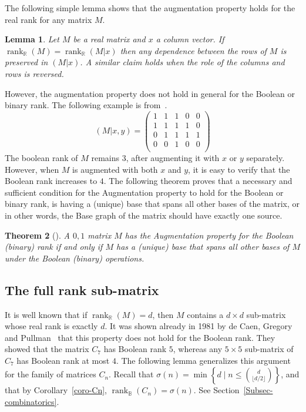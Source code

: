 \documentclass[11pt]{article}
\newtheorem{theorem}{Theorem}
\newtheorem{lemma}[theorem]{Lemma}
\newcommand{\rank}{\mathop{\mathrm{rank}}}
\newcommand{\Rbool}{{\rank}_\mathbb{B}}
\newcommand{\Rreal}{{\rank}_\mathbb{R}}
\begin{document}
The following simple lemma shows that the augmentation property holds for the real rank for any matrix $M$. 

\begin{lemma}
\label{sumofrowaugmented}
Let $M$ be a real matrix and $x$ a column vector.
If $\Rreal(M) = \Rreal(M|x)$ then any dependence between the rows of $M$ is preserved in $(M|x)$.
A similar claim holds when the role of the columns and rows is reversed.
\end{lemma}

However, the augmentation property does not hold in general for the Boolean or binary  rank. The following example is from~\cite{parnas2018augmentation}.
$$
(M|x,y)=
\left(
     \begin{array}{ccc|cc}
 1 & 1 & 1 &0&0\\
 1 & 1 & 1 &1&0\\
 0 & 1 & 1 &1&1\\
 0 & 0& 1  &0&0\\
\end{array}
\right)
$$
The boolean rank of $M$ remains $3$, after augmenting it with $x$ or $y$ separately.
However, when $M$ is augmented with both $x$ and $y$, it is easy to verify that the Boolean rank increases to $4$.
The following theorem proves that a necessary and sufficient condition for the Augmentation property to hold
for the Boolean or binary rank, is having a (unique) base that spans all other bases of the matrix,
or in other words, the Base graph of the matrix should have exactly one source.

\begin{theorem}[\cite{parnas2018augmentation}]
A $0,1$ matrix $M$ has the Augmentation property for the Boolean (binary)
rank if and only if  $M$ has a (unique) base that spans all other bases of $M$ under the Boolean (binary) operations.
\end{theorem}


\subsection{The full rank sub-matrix}
\label{Subsec-fullrank}
It is well known that if $\Rreal(M) = d$, then $M$ contains a $d \times d$ sub-matrix whose real rank is exactly $d$.
It was shown already in 1981 by de Caen, Gregory and Pullman~\cite{Caen2} that this property does not hold for the Boolean rank.
They showed that the matrix $C_7$ has Boolean rank $5$, whereas any $5 \times 5$ sub-matrix of $C_7$ has Boolean rank at most $4$.
The following lemma generalizes this argument for the family of matrices $C_n$.
Recall that $\sigma(n) = \min \left\{d\;|\; n \leq {d \choose \lfloor d/2\rfloor}\right\}$,
and that by Corollary~\ref{coro-Cn}, $\Rbool(C_{n}) = \sigma(n)$. See Section~\ref{Subsec-combinatorics}.
\end{document}
